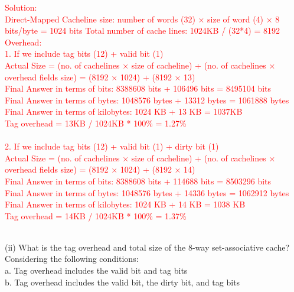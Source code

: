 \documentclass[a4paper,10pt]{article}
\begin{document}
\begin{enumerate}
\noindent\fbox
{%
    \parbox{\linewidth}
    {%
    \textcolor{red}{
    Solution: \\
Direct-Mapped
Cacheline size: number of words (32) × size of word (4) × 8 bits/byte = 1024 bits
Total number of cache lines: 1024KB / (32*4) = 8192
\\
Overhead:
\\
1. If we include tag bits (12) + valid bit (1)\\
Actual Size = (no. of cachelines × size of cacheline) + (no. of cachelines × overhead fields size) = (8192 × 1024) + (8192 × 13)\\
Final Answer in terms of bits: 8388608 bits + 106496 bits = 8495104 bits\\
Final Answer in terms of bytes: 1048576 bytes + 13312 bytes = 1061888 bytes\\
Final Answer in terms of kilobytes: 1024 KB + 13 KB = 1037KB \\
Tag overhead = 13KB / 1024KB * 100\% = 1.27\%\\
 \\
2. If we include tag bits (12) + valid bit (1) + dirty bit (1)\\
Actual Size = (no. of cachelines × size of cacheline) + (no. of cachelines × overhead fields size) = (8192 × 1024) + (8192 × 14)\\
Final Answer in terms of bits: 8388608 bits + 114688 bits = 8503296 bits\\
Final Answer in terms of bytes: 1048576 bytes + 14336 bytes = 1062912 bytes\\
Final Answer in terms of kilobytes: 1024 KB + 14 KB = 1038 KB\\
Tag overhead = 14KB / 1024KB * 100\% = 1.37\%\\
}
    }%
}
\\

(ii) What is the tag overhead and total size of the 8-way set-associative cache?\\
Considering the following conditions:\\
a. Tag overhead includes the valid bit and tag bits\\
b. Tag overhead includes the valid bit, the dirty bit, and tag bits\\


\end{enumerate}
\end{document}
